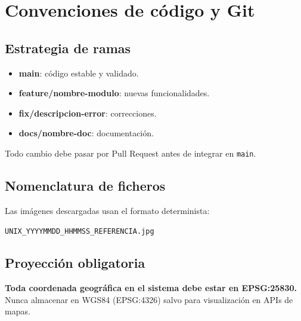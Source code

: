 \chapter{Convenciones de código y Git}
\label{app:conventions}

\section{Estrategia de ramas}

\begin{itemize}[leftmargin=1.5em]
  \item \textbf{main}: código estable y validado.
  \item \textbf{feature/nombre-modulo}: nuevas funcionalidades.
  \item \textbf{fix/descripcion-error}: correcciones.
  \item \textbf{docs/nombre-doc}: documentación.
\end{itemize}

Todo cambio debe pasar por Pull Request antes de integrar en \texttt{main}.

\section{Nomenclatura de ficheros}

Las imágenes descargadas usan el formato determinista:
\begin{center}
\texttt{UNIX\_YYYYMMDD\_HHMMSS\_REFERENCIA.jpg}
\end{center}

\section{Proyección obligatoria}

\textbf{Toda coordenada geográfica en el sistema debe estar en EPSG:25830.}
Nunca almacenar en WGS84 (EPSG:4326) salvo para visualización en APIs de mapas.

